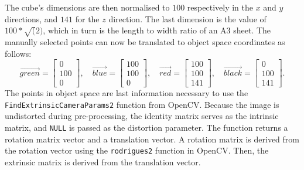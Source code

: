 The cube's dimensions are then normalised to $100$ respectively in the $x$ and
$y$ directions, and $141$ for the $z$ direction. The last dimension is the value
of $100 * \sqrt(2)$, which in turn is the length to width ratio of an A3 sheet.
The manually selected points can now be translated to object space coordinates
as follows:
$$
\vec{green} = \left[ \begin{array}{ccc} 
0\\
100\\
0  \end{array} \right], \quad
\vec{blue} = \left[ \begin{array}{ccc} 
100\\
100\\
0  \end{array} \right], \quad
\vec{red} = \left[ \begin{array}{ccc} 
100\\
100\\
141  \end{array} \right], \quad
\vec{black} = \left[ \begin{array}{ccc} 
0\\
100\\
141  \end{array} \right].
$$
The points in object space are last information necessary to use the
\texttt{FindExtrinsic\-CameraParams2} function from OpenCV. Because the image is
undistorted during pre-processing, the identity matrix serves as the intrinsic
matrix, and \texttt{NULL} is passed as the distortion parameter. The function
returns a rotation matrix vector and a translation vector. A rotation matrix is
derived from the rotation vector using the \texttt{rodrigues2} function in
OpenCV. Then, the extrinsic matrix is derived from the translation vector. 

